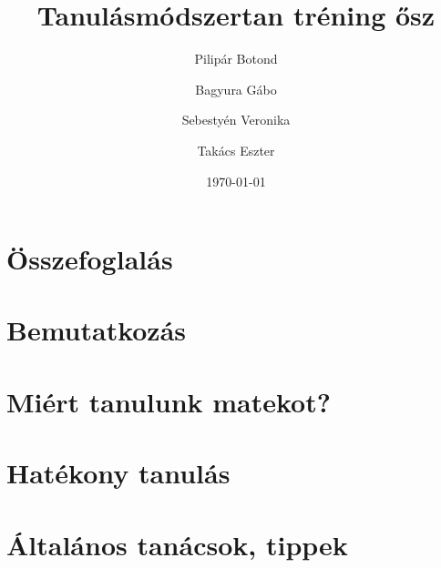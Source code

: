 \documentclass[12pt]{article}
\title{Tanulásmódszertan tréning ősz}
\author{Pilipár Botond}
\author{Bagyura Gábo}
\author{Sebestyén Veronika}
\author{Takács Eszter}
\date{\today}
\begin{document}


\tableofcontents
\clearpage
\section{Összefoglalás}


\section{Bemutatkozás}


\section{Miért tanulunk matekot?}


\section{Hatékony tanulás}


\section{Általános tanácsok, tippek}

\end{document}
